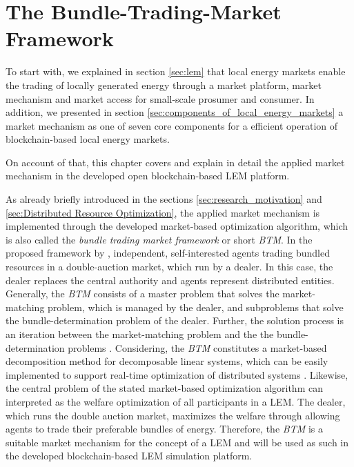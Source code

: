 \section{The Bundle-Trading-Market Framework}
To start with, we explained in section \ref{sec:lem} that local energy markets enable the trading 
of locally generated energy through a market platform, market mechanism and market access for 
small-scale prosumer and consumer. 
In addition, we presented in section \ref{sec:components_of_local_energy_markets} 
a market mechanism as one of seven core components for a efficient operation of blockchain-based
local energy markets.

On account of that, this chapter covers and explain in detail the applied market mechanism in the 
developed open blockchain-based LEM platform. 

As already briefly introduced in the sections \ref{sec:research_motivation} 
and \ref{sec:Distributed Resource Optimization}, the applied market mechanism is implemented 
through the developed market-based optimization algorithm, which is also called the 
\textit{bundle trading market framework} or short \textit{BTM}. 
In the proposed framework by , independent, self-interested
agents trading bundled resources in a double-auction market, which run by a dealer. 
In this case, the dealer replaces the central authority and agents represent distributed
entities. Generally, the \textit{BTM} consists of a master problem that solves 
the market-matching problem, which is managed by the dealer, 
and  subproblems that solve the bundle-determination problem of the dealer.
Further, the solution process is an iteration between the market-matching problem and the 
the bundle-determination problems .
Considering, the \textit{BTM} constitutes a market-based decomposition method 
for decomposable linear systems,
which can be easily implemented to support real-time optimization 
of distributed systems .
Likewise, the central problem of the stated market-based optimization algorithm can 
interpreted as the welfare optimization of all participants in a LEM. 
The dealer, which runs the double auction market, maximizes the welfare through allowing 
agents to trade their preferable bundles of energy.
Therefore, the \textit{BTM} is a suitable market mechanism 
for the concept of a LEM and will be used as such in the developed blockchain-based LEM 
simulation platform. 

